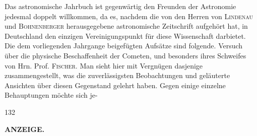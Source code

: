 Das astronomische Jahrbuch ist gegenwärtig den Freunden der Astronomie jedesmal doppelt willkommen, da es, nachdem die von den Herren von \textsc{Lindenau} und \textsc{Bohnenberger} herausgegebene astronomische Zeitschrift aufgehört hat, in Deutschland den einzigen Vereinigungspunkt für diese Wissenschaft darbietet. Die dem vorliegenden Jahrgange beigefügten Aufsätze sind folgende. Versuch über die physische Beschaffenheit der Cometen, und besonders ihres Schweifes von Hrn. Prof. \textsc{Fischer}. Man sieht hier mit Vergnügen dasjenige zusammengestellt, was die zuverlässigsten Beobachtungen und geläuterte Ansichten über diesen Gegenstand gelehrt haben. Gegen einige einzelne Behauptungen möchte sich je-\par
\vfill
{}\hfill{\small 132}\hspace*{.18\textwidth}\par
\clearpage
{}
\noindent{}%
\parbox[b]{\dimexpr\textwidth-20mm\relax}{\centering\small\textbf{ANZEIGE.}}%
\makebox[10mm][r]{}\par\nobreak\medskip
